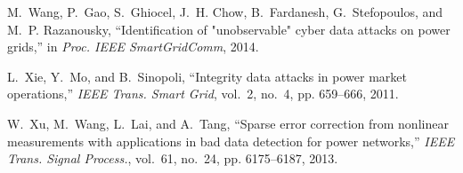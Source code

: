 \documentclass[conference,letterpaper,10pt]{IEEEtran}
\begin{document}
\begin{thebibliography}{10}
M.~Wang, P.~Gao, S.~Ghiocel, J.~H. Chow, B.~Fardanesh, G.~Stefopoulos, and
  M.~P. Razanousky, ``Identification of "unobservable" cyber data attacks on
  power grids,'' in \emph{Proc. IEEE SmartGridComm}, 2014.

L.~Xie, Y.~Mo, and B.~Sinopoli, ``Integrity data attacks in power market
  operations,'' \emph{{IEEE} Trans. Smart Grid}, vol.~2, no.~4, pp. 659--666,
  2011.

W.~Xu, M.~Wang, L.~Lai, and A.~Tang, ``Sparse error correction from nonlinear
  measurements with applications in bad data detection for power networks,''
  \emph{{IEEE} Trans. Signal Process.}, vol.~61, no.~24, pp. 6175--6187, 2013.
\end{thebibliography}
\end{document}
